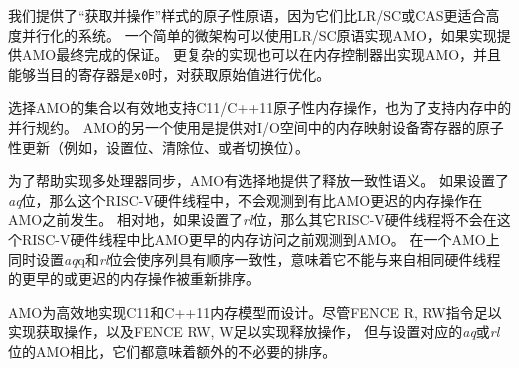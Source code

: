 \begin{commentary}
  我们提供了“获取并操作”样式的原子性原语，因为它们比LR/SC或CAS更适合高度并行化的系统。
  一个简单的微架构可以使用LR/SC原语实现AMO，如果实现提供AMO最终完成的保证。
  更复杂的实现也可以在内存控制器出实现AMO，并且能够当目的寄存器是{\tt x0}时，对获取原始值进行优化。

选择AMO的集合以有效地支持C11/C++11原子性内存操作，也为了支持内存中的并行规约。
AMO的另一个使用是提供对I/O空间中的内存映射设备寄存器的原子性更新（例如，设置位、清除位、或者切换位）。
\end{commentary}

为了帮助实现多处理器同步，AMO有选择地提供了释放一致性语义。
如果设置了{\em aq}位，那么这个RISC-V硬件线程中，不会观测到有比AMO更迟的内存操作在AMO之前发生。
相对地，如果设置了{\em rl}位，那么其它RISC-V硬件线程将不会在这个RISC-V硬件线程中比AMO更早的内存访问之前观测到AMO。
在一个AMO上同时设置{\em aq}q和{\em rl}位会使序列具有顺序一致性，意味着它不能与来自相同硬件线程的更早的或更迟的内存操作被重新排序。

\begin{commentary}

  AMO为高效地实现C11和C++11内存模型而设计。尽管FENCE R, RW指令足以实现获取操作，以及FENCE RW, W足以实现释放操作，
  但与设置对应的{\em aq}或{\em rl}位的AMO相比，它们都意味着额外的不必要的排序。
\end{commentary}

